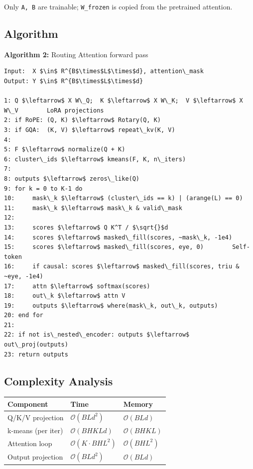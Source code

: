 Only \texttt{A, B} are trainable; \texttt{W\_frozen} is copied from the pretrained attention.

\subsection{Algorithm}

\textbf{Algorithm 2:} Routing Attention forward pass
\begin{lstlisting}
Input:  X $\in$ R^{B$\times$L$\times$d}, attention\_mask
Output: Y $\in$ R^{B$\times$L$\times$d}

1: Q $\leftarrow$ X W\_Q;  K $\leftarrow$ X W\_K;  V $\leftarrow$ X W\_V        LoRA projections
2: if RoPE: (Q, K) $\leftarrow$ Rotary(Q, K)
3: if GQA:  (K, V) $\leftarrow$ repeat\_kv(K, V)
4:
5: F $\leftarrow$ normalize(Q + K)
6: cluster\_ids $\leftarrow$ kmeans(F, K, n\_iters)
7:
8: outputs $\leftarrow$ zeros\_like(Q)
9: for k = 0 to K-1 do
10:     mask\_k $\leftarrow$ (cluster\_ids == k) | (arange(L) == 0)
11:     mask\_k $\leftarrow$ mask\_k & valid\_mask
12:
13:     scores $\leftarrow$ Q K^T / $\sqrt{}$d
14:     scores $\leftarrow$ masked\_fill(scores, ~mask\_k, -1e4)
15:     scores $\leftarrow$ masked\_fill(scores, eye, 0)        Self-token
16:     if causal: scores $\leftarrow$ masked\_fill(scores, triu & ~eye, -1e4)
17:     attn $\leftarrow$ softmax(scores)
18:     out\_k $\leftarrow$ attn V
19:     outputs $\leftarrow$ where(mask\_k, out\_k, outputs)
20: end for
21:
22: if not is\_nested\_encoder: outputs $\leftarrow$ out\_proj(outputs)
23: return outputs
\end{lstlisting}

\subsection{Complexity Analysis}

\begin{table}[H]
\centering
\small
\begin{tabular}{lll}
\toprule
\textbf{Component} & \textbf{Time} & \textbf{Memory} \\
\midrule
Q/K/V projection & $\mathcal{O}(BLd^2)$ & $\mathcal{O}(BLd)$ \\
k-means (per iter) & $\mathcal{O}(BHKLd)$ & $\mathcal{O}(BHKL)$ \\
Attention loop & $\mathcal{O}(K \cdot BHL^2)$ & $\mathcal{O}(BHL^2)$ \\
Output projection & $\mathcal{O}(BLd^2)$ & $\mathcal{O}(BLd)$ \\
\bottomrule
\end{tabular}
\end{table}

